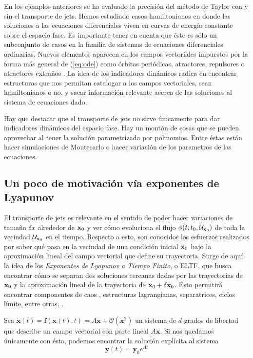 En los ejemplos anteriores se ha evaluado la precisión del método de Taylor con y sin el transporte de jets. Hemos estudiado casos hamiltonianos en donde las soluciones a las ecuaciones diferenciales viven en curvas de energía constante sobre el espacio fase. Es importante tener en cuenta que éste es sólo un subconjunto de casos en la familia de sistemas de ecuaciones diferenciales ordinarias. Nuevos elementos aparecen en los campos vectoriales impuestos por la forma más general de (\ref{eq:ode}) como órbitas periódicas, atractores, repulsores o atractores extraños \cite{Perez2015}. La idea de los indicadores dinámicos radica en encontrar estructuras que nos permitan catalogar a los campos vectoriales, sean hamiltonianos o no, y sacar información relevante acerca de las soluciones al sistema de ecuaciones dado. 

Hay que destacar que el transporte de jets no sirve únicamente para dar indicadores dinámicos del espacio fase. Hay un montón de cosas que se pueden aprovechar al tener la solución parametrizada por polinomios. Entre éstas están hacer simulaciones de Montecarlo o hacer variación de los parametros de las ecuaciones.

\subsection{Un poco de motivación vía exponentes de Lyapunov}

El transporte de jets es relevante en el sentido de poder hacer variaciones de tamaño $\delta x$ alrededor de $\mathbf{x}_0$ y ver cómo evoluciona el flujo $\phi(t;t_0,\mathcal{U}_{\mathbf{x}_0} )$ de toda la vecindad $\mathcal{U}_{\mathbf{x}_0}$ en el tiempo. Respecto a esto, son conocidos los esfuerzos realizados por saber qué pasa en la vecindad de una condición inicial $\mathbf{x}_0$ bajo la aproximación lineal del campo vectorial que define su trayectoria. Surge de aquí la idea de los \textit{Exponentes de Lyapunov a Tiempo Finito}, o ELTF, que busca encontrar cómo se separan dos soluciones cercanas dadas por las trayectorias de $\mathbf{x}_0$ y la aproximación lineal de la trayectoria de $\mathbf{x}_0 + \delta\mathbf{x}_0$. Esto permitirá encontrar componentes de caos , estructuras lagrangianas, separatrices, ciclos límite, entre otras, \cite{Perez2015,Perez2013}. 

Sea $\dot{\mathbf{x}}(t) = \mathbf{f}(\mathbf{x}(t),t) = A\mathbf{x}+\mathcal{O}(\mathbf{x}^2)$ un sistema de $d$ grados de libertad que describe un campo vectorial con parte lineal $A \mathbf{x}$. Si nos quedamos únicamente con ésta, podemos encontrar la solución explícita al sistema
\begin{equation*}
 \mathbf{y}(t) = \mathbf{y}_0 e^{\Lambda t}
\end{equation*}

